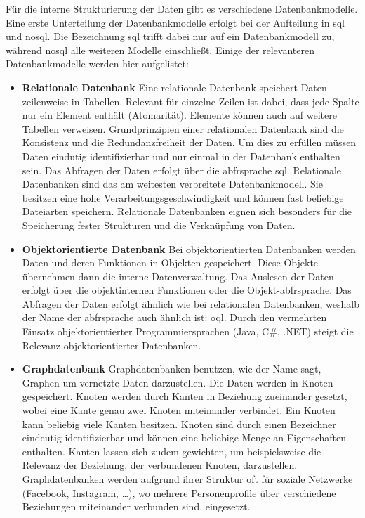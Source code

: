 Für die interne Strukturierung der Daten gibt es verschiedene Datenbankmodelle. Eine erste Unterteilung der Datenbankmodelle erfolgt bei der Aufteilung in \gls{sql} und \gls{nosql}. Die Bezeichnung \gls{sql} trifft dabei nur auf ein Datenbankmodell zu, während \gls{nosql} alle weiteren Modelle einschließt. Einige der relevanteren Datenbankmodelle \cite{Db-engines:ranking} werden hier aufgelistet:
\begin{itemize}
      \item \textbf{Relationale Datenbank} \newline
            Eine relationale Datenbank speichert Daten zeilenweise in Tabellen. Relevant für einzelne Zeilen ist dabei, dass jede Spalte nur ein Element enthält (Atomarität). Elemente können auch auf weitere Tabellen verweisen. Grundprinzipien einer relationalen Datenbank sind die Konsistenz und die Redundanzfreiheit der Daten. Um dies zu erfüllen müssen Daten eindutig identifizierbar und nur einmal in der Datenbank enthalten sein. Das Abfragen der Daten erfolgt über die \gls{abfrsprache} \gls{sql}.\newline
            Relationale Datenbanken sind das am weitesten verbreitete Datenbankmodell. Sie besitzen eine hohe Verarbeitungsgeschwindigkeit und können fast beliebige Dateiarten speichern. Relationale Datenbanken eignen sich besonders für die Speicherung fester Strukturen und die Verknüpfung von Daten.
      \item \textbf{Objektorientierte Datenbank} \newline
            Bei objektorientierten Datenbanken werden Daten und deren Funktionen in Objekten gespeichert. Diese Objekte übernehmen dann die interne Datenverwaltung. Das Auslesen der Daten erfolgt über die objektinternen Funktionen oder die Objekt-\gls{abfrsprache}. Das Abfragen der Daten erfolgt ähnlich wie bei relationalen Datenbanken, weshalb der Name der \gls{abfrsprache} auch ähnlich ist: \gls{oql}. Durch den vermehrten Einsatz objektorientierter Programmiersprachen (Java, C\#, .NET) steigt die Relevanz objektorientierter Datenbanken.
      \item  \textbf{Graphdatenbank} \newline
            Graphdatenbanken benutzen, wie der Name sagt, Graphen um vernetzte Daten darzustellen. Die Daten werden in Knoten gespeichert. Knoten werden durch Kanten in Beziehung zueinander gesetzt, wobei eine Kante genau zwei Knoten miteinander verbindet. Ein Knoten kann beliebig viele Kanten besitzen. Knoten sind durch einen Bezeichner eindeutig identifizierbar und können eine beliebige Menge an Eigenschaften enthalten. Kanten lassen sich zudem gewichten, um beispielsweise die Relevanz der Beziehung, der verbundenen Knoten, darzustellen. Graphdatenbanken werden aufgrund ihrer Struktur oft für soziale Netzwerke (Facebook, Instagram, \dots), wo mehrere Personenprofile über verschiedene Beziehungen miteinander verbunden sind, eingesetzt.

\end{itemize}
